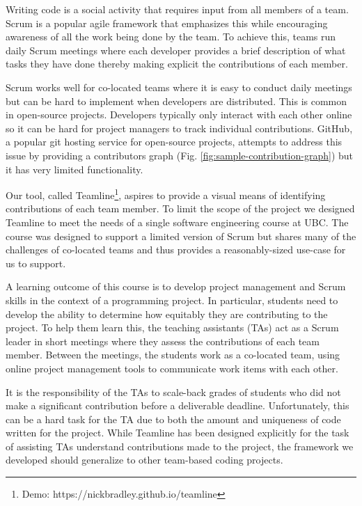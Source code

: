 \documentclass[../manifest.tex]{subfiles}
\begin{document}
Writing code is a social activity that requires input from all members of a team. Scrum is a popular agile framework that emphasizes this while encouraging awareness of all the work being done by the team. To achieve this, teams run daily Scrum meetings where each developer provides a brief description of what tasks they have done thereby making explicit the contributions of each member.

Scrum works well for co-located teams where it is easy to conduct daily meetings but can be hard to implement when developers are distributed. This is common in open-source projects. Developers typically only interact with each other online so it can be hard for project managers to track individual contributions. GitHub, a popular git hosting service for open-source projects, attempts to address this issue by providing a contributors graph (Fig. \ref{fig:sample-contribution-graph}) but it has very limited functionality.

Our tool, called Teamline\footnote{Demo: https://nickbradley.github.io/teamline}, aspires to provide a visual means of identifying contributions of each team member. To limit the scope of the project we designed Teamline to meet the needs of a single software engineering course at UBC. The course was designed to support a limited version of Scrum but shares many of the challenges of co-located teams and thus provides a reasonably-sized use-case for us to support.

A learning outcome of this course is to develop project management and Scrum skills in the context of a programming project. In particular, students need to develop the ability to determine how equitably they are contributing to the project. To help them learn this, the teaching assistants (TAs) act as a Scrum leader in short meetings where they assess the contributions of each team member. Between the meetings, the students work as a co-located team, using online project management tools to communicate work items with each other.

It is the responsibility of the TAs to scale-back grades of students who did not make a significant contribution before a deliverable deadline. Unfortunately, this can be a hard task for the TA due to both the amount and uniqueness of code written for the project. While Teamline has been designed explicitly for the task of assisting TAs understand contributions made to the project, the framework we developed should generalize to other team-based coding projects.
\end{document}
